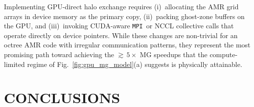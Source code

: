 \documentclass[fleqn,usenatbib]{mnras}
\newcommand{\mpi}[0]{\texttt{MPI}}
\begin{document}
Implementing GPU-direct halo exchange requires (i)~allocating the
AMR grid arrays in device memory as the primary copy, (ii)~packing
ghost-zone buffers on the GPU, and (iii)~invoking CUDA-aware \mpi\
or NCCL collective calls that operate directly on device pointers.
While these changes are non-trivial for an octree AMR code with
irregular communication patterns, they represent the most promising
path toward achieving the ${\gtrsim}\,5\times$ MG speedups that the
compute-limited regime of Fig.~\ref{fig:gpu_mg_model}(a) suggests
is physically attainable.


\section{CONCLUSIONS}
\label{sec:conclusions}
\end{document}
